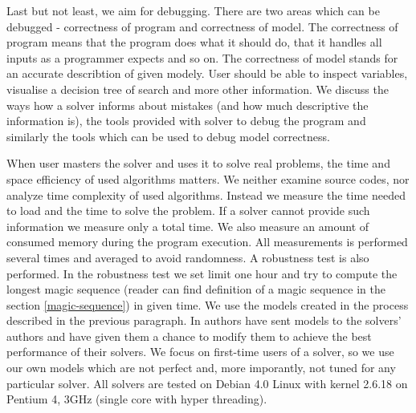 Last but not least, we aim for debugging. There are two areas which can be 
debugged - correctness of program and correctness of model. The correctness of 
program means that the program does what it should do, that it handles all inputs as a programmer expects and so on. 
The correctness of model stands for an accurate describtion of given modely. User should be able to 
inspect variables, visualise a decision tree of search and more other information. 
We discuss the ways how a solver informs about mistakes (and how much descriptive the 
information is), the tools provided with solver to debug the program and similarly the 
tools which can be used to debug model correctness.

When user masters the solver and uses it to solve real problems, the time and space 
efficiency of used algorithms matters. We neither examine source codes, nor analyze 
time complexity of used algorithms. Instead we measure the time needed to 
load and the time to solve the problem. If a solver cannot provide such information 
we measure only a total time. We also measure an amount of consumed memory 
during the program execution. All measurements is performed several times 
and averaged to avoid randomness. A robustness test is also performed. 
In the robustness test we set limit one hour and try to compute the longest magic 
sequence (reader can find definition of a magic sequence in the section \ref{magic-sequence}) 
in given time. We use the models created in the process described in the previous 
paragraph. In \cite{fernandez00} authors have sent models to the solvers' authors and 
have given them a chance to modify them to achieve the best performance of their solvers. 
We focus on first-time users of a solver, so we use our own models which are 
not perfect and, more imporantly, not tuned for any particular solver. All solvers 
are tested on Debian 4.0 Linux with kernel 2.6.18 on Pentium 4, 3GHz (single core 
with hyper threading).